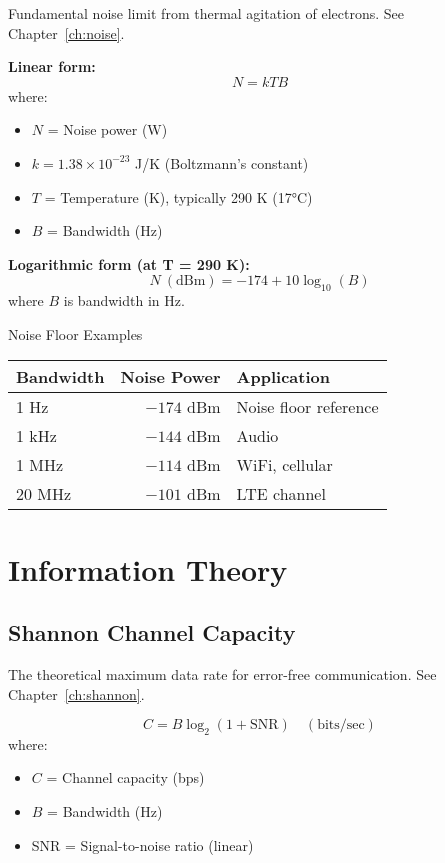 Fundamental noise limit from thermal agitation of electrons. See Chapter~\ref{ch:noise}.

\textbf{Linear form:}
\begin{equation}
N = kTB
\label{eq:thermal-noise}
\end{equation}
where:
\begin{itemize}
\item $N$ = Noise power (W)
\item $k = 1.38 \times 10^{-23}$ J/K (Boltzmann's constant)
\item $T$ = Temperature (K), typically 290 K (17°C)
\item $B$ = Bandwidth (Hz)
\end{itemize}

\textbf{Logarithmic form (at T = 290 K):}
\begin{equation}
N\ (\text{dBm}) = -174 + 10\log_{10}(B)
\label{eq:thermal-noise-db}
\end{equation}
where $B$ is bandwidth in Hz.

\begin{calloutbox}{Noise Floor Examples}
\begin{tabular}{@{}lrl@{}}
\toprule
Bandwidth & Noise Power & Application \\
\midrule
1 Hz & $-174$ dBm & Noise floor reference \\
1 kHz & $-144$ dBm & Audio \\
1 MHz & $-114$ dBm & WiFi, cellular \\
20 MHz & $-101$ dBm & LTE channel \\
\bottomrule
\end{tabular}
\end{calloutbox}

\section{Information Theory}
\label{sec:information-theory}

\subsection{Shannon Channel Capacity}
\label{sec:shannon-capacity}

The theoretical maximum data rate for error-free communication. See Chapter~\ref{ch:shannon}.

\begin{equation}
C = B \log_2(1 + \text{SNR}) \quad (\text{bits/sec})
\label{eq:shannon-capacity}
\end{equation}
where:
\begin{itemize}
\item $C$ = Channel capacity (bps)
\item $B$ = Bandwidth (Hz)
\item SNR = Signal-to-noise ratio (linear)
\end{itemize}

